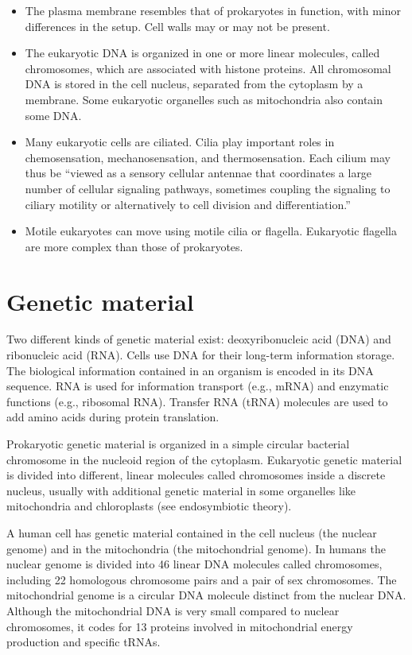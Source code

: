 \begin{itemize}
\tightlist
\item
  The plasma membrane resembles that of prokaryotes in function, with minor differences in the setup. Cell walls may or may not be present.
\item
  The eukaryotic DNA is organized in one or more linear molecules, called chromosomes, which are associated with histone proteins. All chromosomal DNA is stored in the cell nucleus, separated from the cytoplasm by a membrane. Some eukaryotic organelles such as mitochondria also contain some DNA.
\item
  Many eukaryotic cells are ciliated. Cilia play important roles in chemosensation, mechanosensation, and thermosensation. Each cilium may thus be ``viewed as a sensory cellular antennae that coordinates a large number of cellular signaling pathways, sometimes coupling the signaling to ciliary motility or alternatively to cell division and differentiation.''
\item
  Motile eukaryotes can move using motile cilia or flagella. Eukaryotic flagella are more complex than those of prokaryotes.
\end{itemize}

\hypertarget{genetic-material}{%
\section{Genetic material}\label{genetic-material}}

Two different kinds of genetic material exist: deoxyribonucleic acid (DNA) and ribonucleic acid (RNA). Cells use DNA for their long-term information storage. The biological information contained in an organism is encoded in its DNA sequence. RNA is used for information transport (e.g., mRNA) and enzymatic functions (e.g., ribosomal RNA). Transfer RNA (tRNA) molecules are used to add amino acids during protein translation.

Prokaryotic genetic material is organized in a simple circular bacterial chromosome in the nucleoid region of the cytoplasm. Eukaryotic genetic material is divided into different, linear molecules called chromosomes inside a discrete nucleus, usually with additional genetic material in some organelles like mitochondria and chloroplasts (see endosymbiotic theory).

A human cell has genetic material contained in the cell nucleus (the nuclear genome) and in the mitochondria (the mitochondrial genome). In humans the nuclear genome is divided into 46 linear DNA molecules called chromosomes, including 22 homologous chromosome pairs and a pair of sex chromosomes. The mitochondrial genome is a circular DNA molecule distinct from the nuclear DNA. Although the mitochondrial DNA is very small compared to nuclear chromosomes, it codes for 13 proteins involved in mitochondrial energy production and specific tRNAs.


